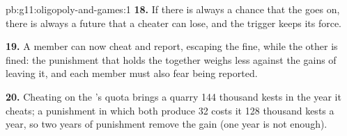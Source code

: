 \begin{solution}{pb:g11:oligopoly-and-games:1}
\textbf{18.} If there is always a chance that the  goes on, there is always a future that a cheater can lose, and the trigger  keeps its force.

\textbf{19.} A member can now cheat and report, escaping the fine, while the other is fined: the punishment that holds the  together weighs less against the gains of
leaving it, and each member must also fear being reported.

\textbf{20.} Cheating on the 's quota brings a quarry 144 thousand kests in the year it cheats; a punishment in which both produce 32 costs it 128 thousand kests a year,
so two years of punishment remove the gain (one year is not enough).
\end{solution}
